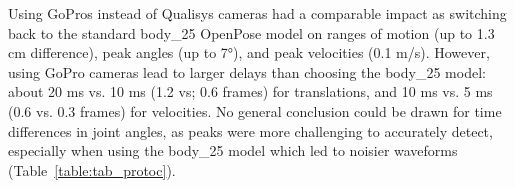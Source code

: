 Using GoPros instead of Qualisys cameras had a comparable impact as switching back to the standard body\_25 OpenPose model on ranges of motion (up to 1.3 cm difference), peak angles (up to 7°), and peak velocities (0.1 m/s). However, using GoPro cameras lead to larger delays than choosing the body\_25 model: about 20 ms vs. 10 ms (1.2 vs; 0.6 frames) for translations, and 10 ms vs. 5 ms (0.6 vs. 0.3 frames) for velocities. No general conclusion could be drawn for time differences in joint angles, as peaks were more challenging to accurately detect, especially when using the body\_25 model which led to noisier waveforms (Table~\ref{table:tab_protoc}).

\begin{table}[!ht]
      \centering
\end{table}

